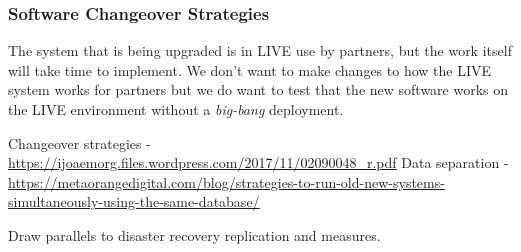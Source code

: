   \subsubsection{Software Changeover Strategies}
  The system that is being upgraded is in LIVE use by partners, but the work itself will take time to implement. We don't want to make changes to how
  the LIVE system works for partners but we do want to test that the new software works on the LIVE environment without a \textit{big-bang} deployment.

  Changeover strategies - \url{https://ijoaemorg.files.wordpress.com/2017/11/02090048_r.pdf}
  Data separation - \url{https://metaorangedigital.com/blog/strategies-to-run-old-new-systems-simultaneously-using-the-same-database/}

  Draw parallels to disaster recovery replication and measures.


\newpage